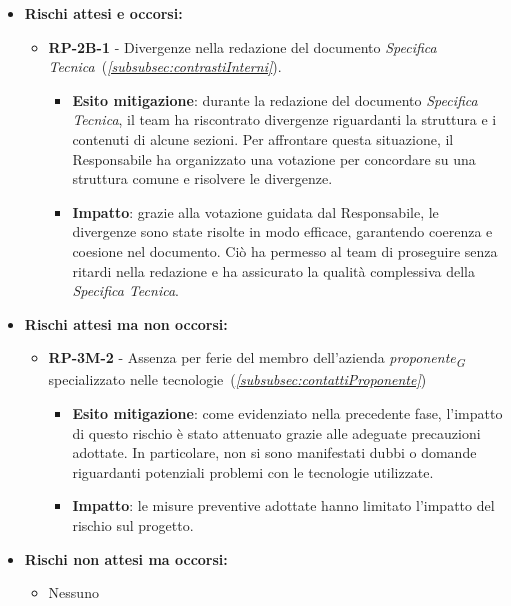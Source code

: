 \begin{itemize}
    \item \textbf{Rischi attesi e occorsi:}
        \begin{itemize}
            \item \textbf{RP-2B-1} - Divergenze nella redazione del documento \textit{Specifica Tecnica}~(\textit{\ref{subsubsec:contrastiInterni}}).
            \begin{itemize}
                \item \textbf{Esito mitigazione}: durante la redazione del documento \textit{Specifica Tecnica}, il team ha riscontrato divergenze riguardanti la struttura e i contenuti di alcune sezioni. Per affrontare questa situazione, il Responsabile ha organizzato una votazione per concordare su una struttura comune e risolvere le divergenze.
                \item \textbf{Impatto}: grazie alla votazione guidata dal Responsabile, le divergenze sono state risolte in modo efficace, garantendo coerenza e coesione nel documento. Ciò ha permesso al team di proseguire senza ritardi nella redazione e ha assicurato la qualità complessiva della \textit{Specifica Tecnica}.
            \end{itemize}
            
        \end{itemize}
    \item \textbf{Rischi attesi ma non occorsi:}
        \begin{itemize}
            \item \textbf{RP-3M-2} - Assenza per ferie del membro dell'azienda \textit{proponente}\textsubscript{\textit{G}} specializzato nelle tecnologie~(\textit{\ref{subsubsec:contattiProponente}})
                \begin{itemize}
                    \item \textbf{Esito mitigazione}: come evidenziato nella precedente fase, l'impatto di questo rischio è stato attenuato grazie alle adeguate precauzioni adottate. In particolare, non si sono manifestati dubbi o domande riguardanti potenziali problemi con le tecnologie utilizzate.
                    \item \textbf{Impatto}: 
                    le misure preventive adottate hanno limitato l'impatto del rischio sul progetto.
                \end{itemize}
        \end{itemize}
    \item \textbf{Rischi non attesi ma occorsi:}
        \begin{itemize}
            \item Nessuno
        \end{itemize}
\end{itemize}


